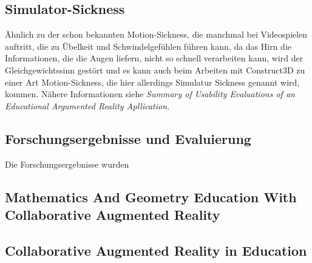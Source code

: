 \documentclass[deutsch]{llncs}
\begin{document}
\subsection{Simulator-Sickness}
\label{subsec:}
Ähnlich zu der schon bekannten Motion-Sickness, die manchmal bei Videospielen auftritt, die zu Übelkeit und Schwindelgefühlen führen kann, da das Hirn die Informationen, die die Augen liefern, nicht so schnell verarbeiten kann, wird der Gleichgewichtssinn gestört und es kann auch beim Arbeiten mit Construct3D zu einer Art Motion-Sickness, die hier allerdings
Simulatur Sickness genannt wird, kommen. Nähere Informationen siehe \textit{Summary of Usability Evaluations of an Educational Argumented Reality Apllication.}

\subsection{Forschungsergebnisse und Evaluierung}
\label{subsec:}
Die Forschungsergebnisse wurden 

\subsection{Mathematics And Geometry Education With Collaborative Augmented Reality}

\subsection{Collaborative Augmented Reality in Education}
\end{document}
